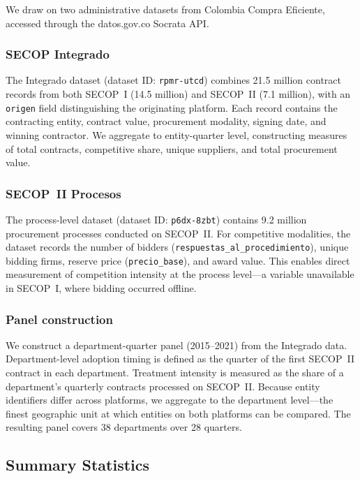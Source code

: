 \documentclass[12pt]{article}
\begin{document}
We draw on two administrative datasets from Colombia Compra Eficiente, accessed through the datos.gov.co Socrata API.

\subsubsection*{SECOP Integrado} The Integrado dataset (dataset ID: \texttt{rpmr-utcd}) combines 21.5 million contract records from both SECOP~I (14.5 million) and SECOP~II (7.1 million), with an \texttt{origen} field distinguishing the originating platform. Each record contains the contracting entity, contract value, procurement modality, signing date, and winning contractor. We aggregate to entity-quarter level, constructing measures of total contracts, competitive share, unique suppliers, and total procurement value.

\subsubsection*{SECOP~II Procesos} The process-level dataset (dataset ID: \texttt{p6dx-8zbt}) contains 9.2 million procurement processes conducted on SECOP~II. For competitive modalities, the dataset records the number of bidders (\texttt{respuestas\_al\_procedimiento}), unique bidding firms, reserve price (\texttt{precio\_base}), and award value. This enables direct measurement of competition intensity at the process level---a variable unavailable in SECOP~I, where bidding occurred offline.

\subsubsection*{Panel construction} We construct a department-quarter panel (2015--2021) from the Integrado data. Department-level adoption timing is defined as the quarter of the first SECOP~II contract in each department. Treatment intensity is measured as the share of a department's quarterly contracts processed on SECOP~II. Because entity identifiers differ across platforms, we aggregate to the department level---the finest geographic unit at which entities on both platforms can be compared. The resulting panel covers 38 departments over 28 quarters.

\subsection{Summary Statistics}


\end{document}
